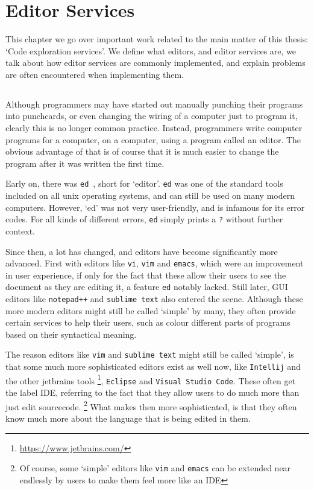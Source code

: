 

\chapter{Editor Services}
\label{chap:editor-services}

This chapter we go over important work related to the main matter of this thesis: `Code exploration services'.
We define what editors, and editor services are, we talk about how editor services are commonly implemented,
and explain problems are often encountered when implementing them.

\section*{}

Although programmers may have started out manually punching their programs into punchcards,
or even changing the wiring of a computer just to program it, clearly this is no longer common practice.
Instead, programmers write computer programs for a computer, on a computer, using a program called an editor.
The obvious advantage of that is of course that it is much easier to change the program after
it was written the first time.

Early on, there was \texttt{ed}~\autocite{ed}, short for `editor'.
\texttt{ed} was one of the standard tools included on all unix operating systems, and can still be used on many modern computers.
However, `ed' was not very user-friendly, and is infamous for its error codes.
For all kinds of different errors, \texttt{ed} simply prints a \texttt{?} without further context.

Since then, a lot has changed, and editors have become significantly more advanced.
First with editors like \texttt{vi}, \texttt{vim} and \texttt{emacs}, which were an improvement in user experience, if only for the
fact that these allow their users to see the document as they are editing it, a feature \texttt{ed} notably lacked.
Still later, \ac{GUI} editors like \texttt{notepad++} and \texttt{sublime text} also entered the scene.
Although these more modern editors might still be called `simple' by many, they often provide certain services to help their users,
such as colour different parts of programs based on their syntactical meaning.

The reason editors like \texttt{vim} and \texttt{sublime text} might still be called `simple', is that some much more sophisticated editors exist as well now,
like \texttt{Intellij} and the other jetbrains tools \footnote{\url{https://www.jetbrains.com/}}, \texttt{Eclipse} and \texttt{Visual Studio Code}.
These often get the label \ac{IDE}, referring to the fact that they allow users to do much more than just edit sourcecode.
\footnote{Of course, some `simple' editors like \texttt{vim} and \texttt{emacs} can be extended near endlessly by users to make them feel more like an \ac{IDE}}
What makes then more sophisticated, is that they often know much more about the language that is being edited in them.

